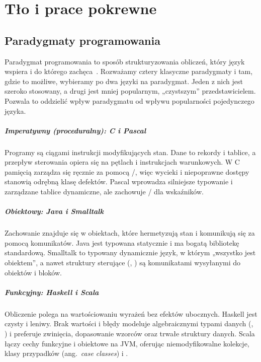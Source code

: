 \chapter{Tło i prace pokrewne}
\label{ch:background}

\section{Paradygmaty programowania}
\label{sec:paradigms}

Paradygmat programowania to sposób strukturyzowania obliczeń, który język wspiera i do którego
zachęca~\cite{floyd1979paradigms,vanroy2004ctm}. Rozważamy cztery klasyczne paradygmaty i tam,
gdzie to możliwe, wybieramy po dwa języki na paradygmat. Jeden z nich jest szeroko stosowany,
a drugi jest mniej popularnym, „czystszym” przedstawicielem. Pozwala to oddzielić wpływ paradygmatu
od wpływu popularności pojedynczego języka.

\paragraph{Imperatywny (proceduralny): C i Pascal} Programy są ciągami instrukcji modyfikujących
stan. Dane to rekordy i tablice, a przepływ sterowania opiera się na pętlach i instrukcjach
warunkowych. W C pamięcią zarządza się ręcznie za pomocą /, więc wycieki
i niepoprawne dostępy stanowią odrębną klasę defektów. Pascal wprowadza silniejsze typowanie
i zarządzane tablice dynamiczne, ale zachowuje / dla wskaźników.

\paragraph{Obiektowy: Java i Smalltalk} Zachowanie znajduje się w obiektach, które hermetyzują stan
i komunikują się za pomocą komunikatów. Java jest typowana statycznie i ma bogatą bibliotekę
standardową. Smalltalk to typowany dynamicznie język, w którym „wszystko jest obiektem”, a nawet
struktury sterujące (, ) są komunikatami wysyłanymi do obiektów i bloków.

\paragraph{Funkcyjny: Haskell i Scala} Obliczenie polega na wartościowaniu wyrażeń bez efektów
ubocznych. Haskell jest czysty i leniwy. Brak wartości i błędy modeluje algebraicznymi typami danych
(, ) i preferuje zwinięcia, dopasowanie wzorców oraz trwałe struktury
danych. Scala łączy cechy funkcyjne i obiektowe na JVM, oferując niemodyfikowalne kolekcje, klasy
przypadków (ang.~\emph{case classes}) i .


